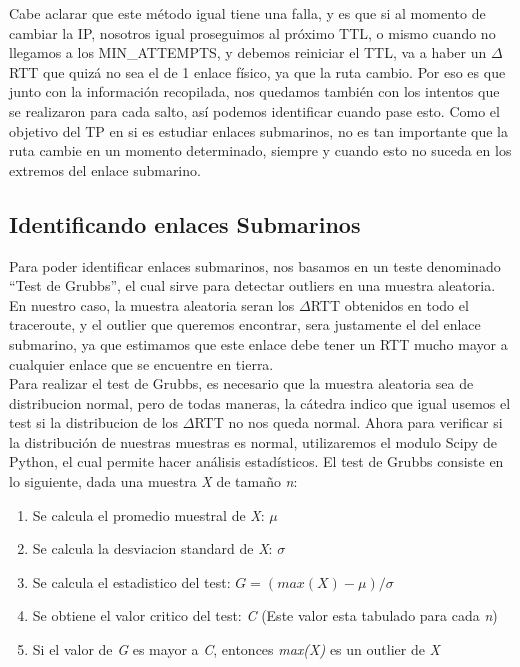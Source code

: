Cabe aclarar que este método igual tiene una falla, y es que si al momento de cambiar la IP, nosotros igual proseguimos al próximo TTL, o mismo cuando no llegamos a los MIN\_ATTEMPTS, y debemos reiniciar el TTL, va a haber un $\Delta$RTT que quizá no sea el de 1 enlace físico, ya que la ruta cambio. Por eso es que junto con la información recopilada, nos quedamos también con los intentos que se realizaron para cada salto, así podemos identificar cuando pase esto. Como el objetivo del TP en si es estudiar enlaces submarinos, no es tan importante que la ruta cambie en un momento determinado, siempre y cuando esto no suceda en los extremos del enlace submarino.

\subsection{Identificando enlaces Submarinos}

Para poder identificar enlaces submarinos, nos basamos en un teste denominado ``Test de Grubbs'', el cual sirve para detectar outliers en una muestra aleatoria. En nuestro caso, la muestra aleatoria seran los $\Delta$RTT obtenidos en todo el traceroute, y el outlier que queremos encontrar, sera justamente el del enlace submarino, ya que estimamos que este enlace debe tener un RTT mucho mayor a cualquier enlace que se encuentre en tierra.\\ 

Para realizar el test de Grubbs, es necesario que la muestra aleatoria sea de distribucion normal, pero de todas maneras, la cátedra indico que igual usemos el test si la distribucion de los $\Delta$RTT no nos queda normal. Ahora para verificar si la distribución de nuestras muestras es normal, utilizaremos el modulo Scipy de Python, el cual permite hacer análisis estadísticos. El test de Grubbs consiste en lo siguiente, dada una muestra \textit{X} de tamaño \textit{n}:

\begin{enumerate}
	\item Se calcula el promedio muestral de \textit{X}: $\mu$
	\item Se calcula la desviacion standard de \textit{X}: $\sigma$
	\item Se calcula el estadistico del test: $G = (max(X) - \mu) / \sigma$
	\item Se obtiene el valor critico del test: \textit{C} (Este valor esta tabulado para cada \textit{n})
	\item Si el valor de \textit{G} es mayor a \textit{C}, entonces \textit{max(X)} es un outlier de \textit{X}
\end{enumerate}









